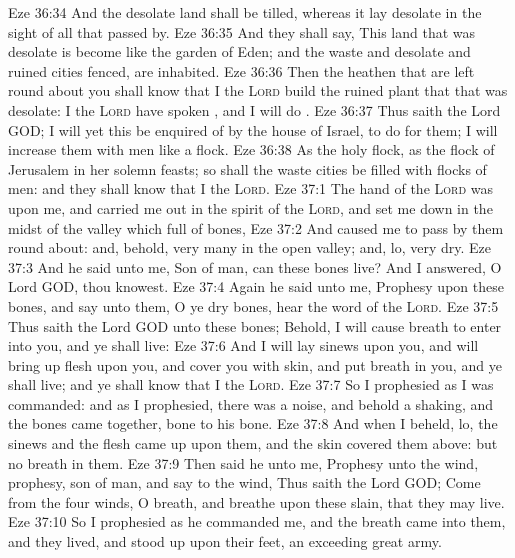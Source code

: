 \vs Eze 36:34 And the desolate land shall be tilled, whereas it lay desolate in the sight of all that passed by.
\vs Eze 36:35 And they shall say, This land that was desolate is become like the garden of Eden; and the waste and desolate and ruined cities  fenced,  are inhabited.
\vs Eze 36:36 Then the heathen that are left round about you shall know that I the \textsc{Lord} build the ruined  plant that that was desolate: I the \textsc{Lord} have spoken , and I will do .
\vs Eze 36:37 Thus saith the Lord GOD; I will yet  this be enquired of by the house of Israel, to do  for them; I will increase them with men like a flock.
\vs Eze 36:38 As the holy flock, as the flock of Jerusalem in her solemn feasts; so shall the waste cities be filled with flocks of men: and they shall know that I  the \textsc{Lord}.
\vs Eze 37:1 The hand of the \textsc{Lord} was upon me, and carried me out in the spirit of the \textsc{Lord}, and set me down in the midst of the valley which  full of bones,
\vs Eze 37:2 And caused me to pass by them round about: and, behold,  very many in the open valley; and, lo,  very dry.
\vs Eze 37:3 And he said unto me, Son of man, can these bones live? And I answered, O Lord GOD, thou knowest.
\vs Eze 37:4 Again he said unto me, Prophesy upon these bones, and say unto them, O ye dry bones, hear the word of the \textsc{Lord}.
\vs Eze 37:5 Thus saith the Lord GOD unto these bones; Behold, I will cause breath to enter into you, and ye shall live:
\vs Eze 37:6 And I will lay sinews upon you, and will bring up flesh upon you, and cover you with skin, and put breath in you, and ye shall live; and ye shall know that I  the \textsc{Lord}.
\vs Eze 37:7 So I prophesied as I was commanded: and as I prophesied, there was a noise, and behold a shaking, and the bones came together, bone to his bone.
\vs Eze 37:8 And when I beheld, lo, the sinews and the flesh came up upon them, and the skin covered them above: but  no breath in them.
\vs Eze 37:9 Then said he unto me, Prophesy unto the wind, prophesy, son of man, and say to the wind, Thus saith the Lord GOD; Come from the four winds, O breath, and breathe upon these slain, that they may live.
\vs Eze 37:10 So I prophesied as he commanded me, and the breath came into them, and they lived, and stood up upon their feet, an exceeding great army.
